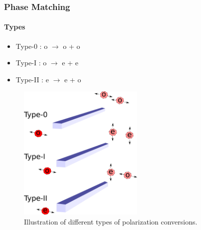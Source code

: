\documentclass[serif,8pt]{beamer}
\begin{document}
\begin{frame}[t]
	\frametitle{Phase Matching}
	\framesubtitle{Types}
	\begin{minipage}[l]{0.35\textwidth}
		\begin{itemize}
			\item Type-0 : o $\rightarrow$ o + o
			\item Type-I : o $\rightarrow$ e + e
			\item Type-II : e $\rightarrow$ e + o
		\end{itemize}
	\end{minipage}
	\begin{minipage}[r]{0.60\textwidth}
		\begin{figure}
			\begin{center}
				\includegraphics[width=6cm]{TypesOfConversions}
			\end{center}
			\caption{Illustration of different types of polarization conversions.}
		\end{figure}
	\end{minipage}
\end{frame}
\end{document}
